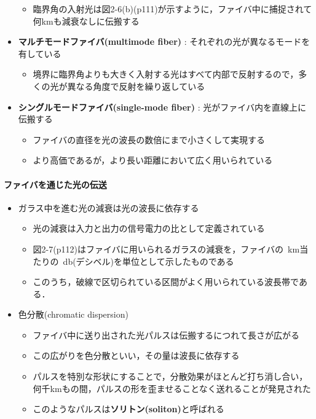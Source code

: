 \documentclass[a4paper]{ltjsarticle}
\begin{document}
\begin{itemize}
\begin{itemize}
					\item 臨界角の入射光は図2-6(b)(p111)が示すように，ファイバ中に捕捉されて何kmも減衰なしに伝搬する
				\end{itemize}
				\item \textbf{マルチモードファイバ(multimode fiber)} : それぞれの光が異なるモードを有している
				\begin{itemize}
					\item 境界に臨界角よりも大きく入射する光はすべて内部で反射するので，多くの光が異なる角度で反射を繰り返している
				\end{itemize}
				\item \textbf{シングルモードファイバ(single-mode fiber)} : 光がファイバ内を直線上に伝搬する
				\begin{itemize}
					\item ファイバの直径を光の波長の数倍にまで小さくして実現する
					\item より高価であるが，より長い距離において広く用いられている
				\end{itemize}
			\end{itemize}
			\paragraph{ファイバを通じた光の伝送}
				\begin{itemize}
					\item ガラス中を進む光の減衰は光の波長に依存する
					\begin{itemize}
						\item 光の減衰は入力と出力の信号電力の比として定義されている
						\item 図2-7(p112)はファイバに用いられるガラスの減衰を，ファイバの\SI{}{km}当たりの\SI{}{db}(デシベル)を単位として示したものである
						\item このうち，破線で区切られている区間がよく用いられている波長帯である．
					\end{itemize}
					\item 色分散(chromatic dispersion)
					\begin{itemize}
						\item ファイバ中に送り出された光パルスは伝搬するにつれて長さが広がる
						\item この広がりを色分散といい，その量は波長に依存する
						\item パルスを特別な形状にすることで，分散効果がほとんど打ち消し合い，何千kmもの間，パルスの形を歪ませることなく送れることが発見された
						\item このようなパルスは\textbf{ソリトン(soliton)}と呼ばれる
					\end{itemize}
				\end{itemize}
\end{document}
